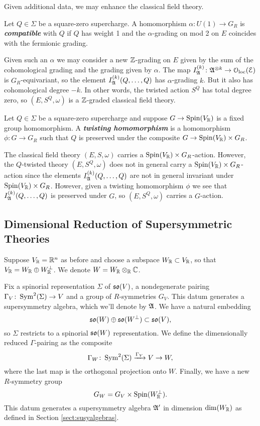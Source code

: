 \documentclass[10pt, oneside]{article}
\newcommand{\defterm}[1]{\textbf{\emph{#1}}}
\begin{document}
Given additional data, we may enhance the classical field theory.

\begin{definition}
Let $Q\in\Sigma$ be a square-zero supercharge. A homomorphism $\alpha\colon U(1)\rightarrow G_R$ is \defterm{compatible} with $Q$ if $Q$ has weight 1 and the $\alpha$-grading on mod 2 on $E$ coincides with the fermionic grading.
\end{definition}

Given such an $\alpha$ we may consider a new $\mathbb Z$-grading on $E$ given by the sum of the cohomological grading and the grading given by $\alpha$. The map $I_{\mathfrak A}^{(k)}\colon \mathfrak A^{\otimes k} \to \mathcal{O}_{\rm loc}(\mathcal E)$ is $G_R$-equivariant, so the element $I_{\mathfrak A}^{(k)}(Q, \dots, Q)$ has $\alpha$-grading $k$. But it also has cohomological degree $-k$. In other words, the twisted action $S^Q$ has total degree zero, so $(E, S^Q, \omega)$ is a $\mathbb Z$-graded classical field theory.

\begin{definition}
Let $Q\in\Sigma$ be a square-zero supercharge and suppose $G\rightarrow \mathrm{Spin}(V_\mathbb R)$ is a fixed group homomorphism. A \defterm{twisting homomorphism} is a homomorphism $\phi\colon G\rightarrow G_R$ such that $Q$ is preserved under the composite $G\rightarrow \mathrm{Spin}(V_\mathbb R)\times G_R$.
\end{definition}

The classical field theory $(E, S, \omega)$ carries a $\mathrm{Spin}(V_\mathbb R)\times G_R$-action. However, the $Q$-twisted theory $(E, S^Q, \omega)$ does not in general carry a $\mathrm{Spin}(V_\mathbb R)\times G_R$-action since the elements $I_{\mathfrak A}^{(k)}(Q, \dots, Q)$ are not in general invariant under $\mathrm{Spin}(V_\mathbb R)\times G_R$. However, given a twisting homomorphism $\phi$ we see that $I_{\mathfrak A}^{(k)}(Q, \dots, Q)$ is preserved under $G$, so $(E, S^Q, \omega)$ carries a $G$-action.

\subsection{Dimensional Reduction of Supersymmetric Theories}

Suppose $V_\mathbb R=\mathbb R^n$ as before and choose a subspace $W_\mathbb R\subset V_\mathbb R$, so that $V_\mathbb R = W_\mathbb R\oplus W^\perp_\mathbb R$. We denote $W=W_{\mathbb R}\otimes_{\mathbb R} \mathbb C$.

Fix a spinorial representation $\Sigma$ of $\mathfrak{so}(V)$, a nondegenerate pairing $\Gamma_V\colon \operatorname{Sym}^2(\Sigma)\rightarrow V$ and a group of $R$-symmetries $G_V$.  This datum generates a supersymmetry algebra, which we'll denote by $\mathfrak{A}$.  We have a natural embedding
\[\mathfrak{so}(W)\oplus \mathfrak{so}(W^{\perp})\subset \mathfrak{so}(V),\]
so $\Sigma$ restricts to a spinorial $\mathfrak{so}(W)$ representation. We define the dimensionally reduced $\Gamma$-pairing as the composite
\[\Gamma_W\colon \operatorname{Sym}^2(\Sigma)\xrightarrow{\Gamma_V} V\rightarrow W,\]
where the last map is the orthogonal projection onto $W$. Finally, we have a new $R$-symmetry group
\[G_W = G_V\times \mathrm{Spin}(W^\perp_\mathbb R).\]
This datum generates a supersymmetry algebra $\mathfrak{A}'$ in dimension $\mathrm{dim}(W_\mathbb R)$ as defined in Section \ref{sect:susyalgebras}.
\end{document}
